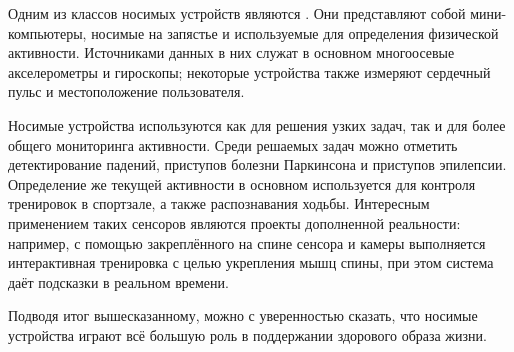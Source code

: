 Одним из классов носимых устройств являются . Они представляют собой мини-компьютеры, носимые на запястье и используемые для определения физической активности. Источниками данных в них служат в основном многоосевые акселерометры и гироскопы; некоторые устройства также измеряют сердечный пульс и местоположение пользователя. 

Носимые устройства используются как для решения узких задач, так и для более общего мониторинга активности. Среди решаемых задач можно отметить детектирование падений\cite{applications_falls}, приступов болезни Паркинсона\cite{applications_parkinson} и приступов эпилепсии\cite{applications_epileptic}. Определение же текущей активности в основном используется для контроля тренировок в спортзале, а также распознавания ходьбы. Интересным применением таких сенсоров являются проекты дополненной реальности: например, с помощью закреплённого на спине сенсора и камеры выполняется интерактивная тренировка с целью укрепления мышц спины, при этом система даёт подсказки в реальном времени\cite{applications_vr}. 

Подводя итог вышесказанному, можно с уверенностью сказать, что носимые устройства играют всё большую роль в поддержании здорового образа жизни.
